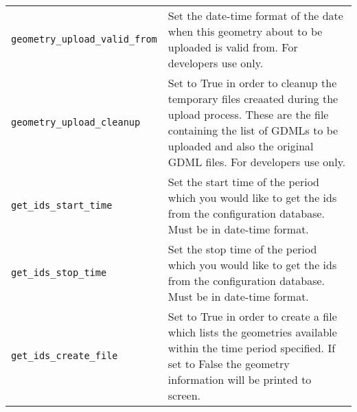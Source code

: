 \begin{table*}
\begin{center}
\begin{tabularx}{\textwidth}{lX}
\verb|geometry_upload_valid_from| & Set the date-time format of the date when this geometry about to be uploaded is valid from. For developers use
only.\\
\verb|geometry_upload_cleanup| & Set to True in order to cleanup the temporary files creaated during the upload process. These are the file
containing the list of GDMLs to be uploaded and also the original GDML files. For developers use only.\\
\verb|get_ids_start_time| & Set the start time of the period which you would like to get the ids from the configuration database. Must be in
date-time format.\\
\verb|get_ids_stop_time| & Set the stop time of the period which you would like to get the ids from the configuration database. Must be in
date-time format.\\
\verb|get_ids_create_file| & Set to True in order to create a file which lists the geometries available within the time period specified. If set to
False the geometry information will be printed to screen.\\
\end{tabularx}
\end{center}
\end{table*}
